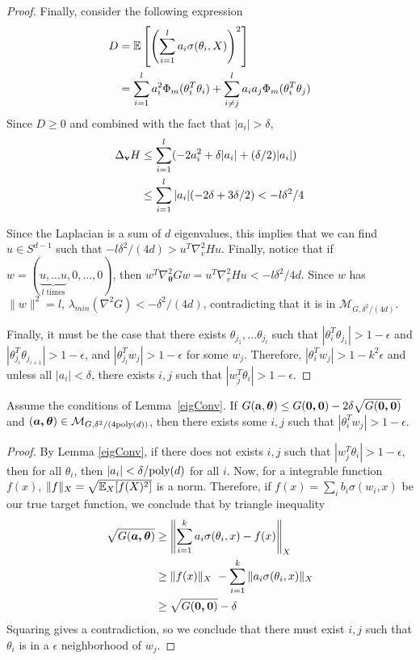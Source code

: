 \begin{proof}
Finally, consider the following expression
%
\begin{align*}
D & = \expt\left[\left( \sum_{i=1}^l a_i \sigma(\theta_i,X)\right)^2\right] \\
%
& =\sum_{i=1}^l a_i^2\Phi_m(\theta_i^T\theta_i) + \sum_{i \neq j}^l
  a_ia_j\Phi_m(\theta_i^T\theta_j)
\end{align*}
%
Since $D \geq 0$ and combined with the fact that $|a_i| > \delta$,
%
\begin{align*}
\Delta_{{\bf v}}H & \leq  \sum_{i=1}^l (-2a_i^2 +\delta |a_i|+(\delta/2)|a_i|) \\
& \leq   \sum_{i=1}^l  |a_i|(-2\delta + 3\delta/2) < -l\delta^2/4
\end{align*}

Since the Laplacian is a sum of $d$ eigenvalues, this implies that we can find $u \in S^{d-1}$ such that $-l\delta^2/(4d) > u^T\nabla^2_v H u$. Finally, notice that if $w = (\underbrace{u,...u}_{l {\textrm{ times}}},0,...,0)$, then $w^T\nabla^2_{\boldsymbol{\theta}} G w = u^T\nabla^2_v H u < -l\delta^2/4d$. Since $w$ has $\|w\|^2 = l$, $\lambda_{min}(\nabla^2 G) < -\delta^2/(4d)$, contradicting that it is in $\mathcal{M}_{G, \delta^2/(4d)}$. 

Finally, it must be the case that there exists $\theta_{j_1},...\theta_{j_l}$ such that
$|\theta_i^T\theta_{j_1}| > 1-\epsilon$ and
$|\theta_{j_{i}}^T\theta_{j_{i+1}}| > 1-\epsilon$, and
$|\theta_{j_l}^Tw_j| > 1-\epsilon$ for some $w_j$. Therefore,
$|\theta_i^Tw_j| > 1- k^2\epsilon$ and unless all $|a_i| <\delta$,  there exists $i, j$ such that $|w_j^T\theta_i| > 1-\epsilon$.
\end{proof}

\begin{lemma}\label{eigRes}
  Assume the conditions of Lemma~\ref{eigConv}. If
$G({\bf a, \boldsymbol{\theta}}) \leq G(\boldsymbol{0,0}) - 2\delta\sqrt{G(\boldsymbol{0,0})}$
  and $(\boldsymbol{a,\theta}) \in \mathcal{M}_{G,\delta^2/(4\mathrm{poly}(d))}$,
  then there exists some $i, j$ such that $|\theta_i^Tw_j| > 1- \epsilon$.
\end{lemma}
 
 \begin{proof}
   By Lemma \ref{eigConv}, if there does not exists $i, j$ such that
   $|w_j^T\theta_i| > 1-\epsilon$, then for all $\theta_i$, then
   $|a_i| < \delta/\mathrm{poly}(d)$ for all $i$. Now, for a integrable
   function $f(x)$, $\| f\|_X = \sqrt{\operatorname*{\mathbb{E}}_X[f(X)^2]}$ is a
   norm. Therefore, if $f(x) = \sum_i b_i \sigma(w_i,x)$ be our true
   target function, we conclude that by triangle inequality
\begin{align*}
\sqrt{G(\boldsymbol{a,\theta})}  & \geq \left\lVert \sum_{i=1}^k a_i \sigma(\theta_i,x) - f(x) \right\rVert_X \\
&\geq \|f(x)\|_X\ - \sum_{i=1}^k \|a_i\sigma(\theta_i,x) \|_X \\
& \geq
  \sqrt{G(\boldsymbol{0,0})} - \delta
\end{align*}
Squaring gives a contradiction, so we conclude that there must exist $i, j$ such that $\theta_i$ is in a $\epsilon$ neighborhood of $w_j$.
 \end{proof}
 
